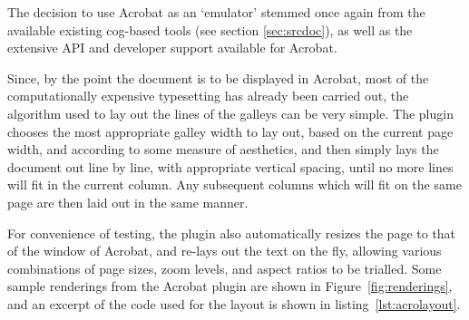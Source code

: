 The decision to use Acrobat as an \ebook{} `emulator' stemmed once again from the available existing \gls{cog}-based tools (see section \ref{sec:srcdoc}), as well as the extensive API and developer support available for Acrobat.

Since, by the point the document is to be displayed in Acrobat, most of the computationally expensive typesetting has already been carried out, the algorithm used to lay out the lines of the galleys can be very simple. The plugin chooses the most appropriate galley width to lay out, based on the current page width, and according to some measure of aesthetics, and then simply lays the document out line by line, with appropriate vertical spacing, until no more lines will fit in the current column. Any subsequent columns which will fit on the same page are then laid out in the same manner.

For convenience of testing, the plugin also automatically resizes the page to that of the window of Acrobat, and re-lays out the text on the fly, allowing various combinations of page sizes, zoom levels, and aspect ratios to be trialled.
Some sample renderings from the Acrobat plugin are shown in Figure~\ref{fig:renderings}, and an excerpt of the code used for the layout is shown in listing~\ref{lst:acrolayout}.

